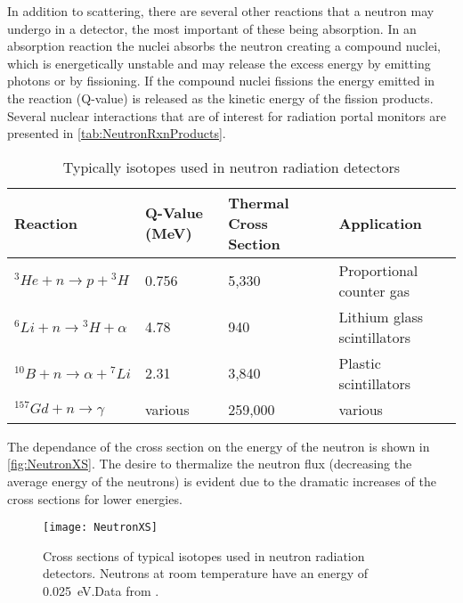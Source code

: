 In addition to scattering, there are several other reactions that a neutron may undergo in a detector, the most important of these being absorption.
In an absorption reaction the nuclei absorbs the neutron creating a compound nuclei, which is energetically unstable and may release the excess energy by emitting photons or by fissioning.
If the compound nuclei fissions the energy emitted in the reaction (Q-value) is released as the kinetic energy of the fission products.
Several nuclear interactions that are of interest for radiation portal monitors are presented in \autoref{tab:NeutronRxnProducts}.
\begin{table}
	\caption[Neutron Reactions and Reaction Energies]{Typically isotopes used in neutron radiation detectors}
	\label{tab:NeutronRxnProducts}
	\centering
	\begin{tabular}{ m{4cm} | m{1.5cm} m{1.5cm} p{5.5cm}} 
		\toprule
		Reaction                           & Q-Value (MeV) & Thermal Cross Section & Application \\
		\midrule
		${}^3He + n \to p +{}^3H$          & 0.756     & 5,330 & Proportional counter gas \\
		${}^6Li + n \to {}^3H + \alpha$    & 4.78      & 940 & Lithium glass scintillators \\
		${}^{10}B + n \to \alpha + {}^7Li$ & 2.31      & 3,840 & Plastic scintillators \\
		${}^{157}Gd + n \to \gamma$        &various    & 259,000 & various \\
		\bottomrule
	\end{tabular}
\end{table}
The dependance of the cross section on the energy of the neutron is shown in \autoref{fig:NeutronXS}.
The desire to thermalize the neutron flux (decreasing the average energy of the neutrons) is evident due to the dramatic increases of the cross sections for lower energies.
\begin{figure}
	\centering
	\texttt{[image: NeutronXS]}
	\caption[Neutron Reaction Cross Sections]{Cross sections of typical isotopes used in neutron radiation detectors.  Neutrons at room temperature have an energy of \SI{0.025}{\eV}.Data from \cite{nndc_cross_2013}.}
	\label{fig:NeutronXS}
\end{figure}
